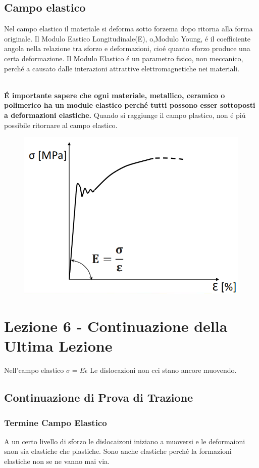 \documentclass{article}
\begin{document}
        \subsection{Campo elastico}
            Nel campo elastico il materiale si deforma sotto forzema dopo ritorna alla forma originale. Il Modulo Eastico Longitudinale(E), o,Modulo Young, \'e il coefficiente angola nella relazione tra sforzo e deformazioni, cio\'e quanto sforzo produce una certa deformazione. Il Modulo Elastico \'e un parametro fisico, non meccanico, perch\'e a causato dalle interazioni attrattive elettromagnetiche nei materiali.\\ \\
            {\textbf{\'E importante sapere che ogni materiale, metallico, ceramico o polimerico ha un module elastico perch\'e tutti possono esser sottoposti a deformazioni elastiche.} Quando si raggiunge il campo plastico, non \'e pi\'u possibile ritornare al campo elastico.
            \begin{figure}[!h]
                \centering
                \includegraphics[width=.85\linewidth]{Diagramma per il modulo di elasticita.png}
            \end{figure}        
    \section{Lezione 6 - Continuazione della Ultima Lezione}
        Nell'campo elastico $\sigma = E \dot \epsilon$
        Le dislocazioni non cci stano ancore muovendo.
        \subsection{Continuazione di Prova di Trazione}
            \subsubsection{Termine Campo Elastico}
                A un certo livello di sforzo le dislocaizoni iniziano a muoversi e le deformaioni snon sia elastiche che plastiche. Sono anche elastiche perch\'e la formazioni elastiche non se ne vanno mai via.
}
\end{document}
